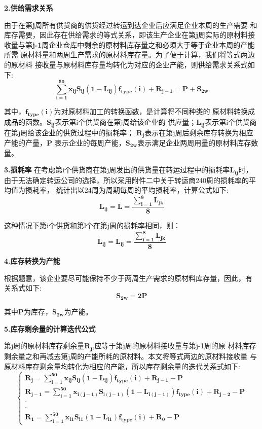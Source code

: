 \documentclass[UTF8]{ctexart}
\begin{document}
\textbf{2.供给需求关系}

由于在第\textbf{j}周所有供货商的供货经过转运到达企业后应满足企业本周的生产需要
和库存需要，因此存在供给需求的等式关系，即该生产企业在第\textbf{j}周实际的原材料接
收量与第\textbf{j-1}周企业仓库中剩余的原材料库存量之和必须大于等于企业本周的产能所需
原材料量和两周生产需求的原材料库存量。为了便于计算，我们将等式两边的原材料
接收量与原材料库存量均转化为对应的企业产能，则供给需求关系式如下:
\begin{equation}
	\mathbf{\sum_{i=1}^{50} x_{ij}S_{ij}(1-L_{ij})f_{type}(i)+R_{j-1}=P+S_{2w}}
\end{equation}

其中，$\mathbf{f_{type}(i)}$为对原材料加工的转换函数，是计算将不同种类的
原材料转换成成品的函数。$\mathbf{S_{ij}}$表示第i个供货商在第j周给该企业的
供应量；$\mathbf{L_{ij}}$表示第i个供货商在第j周给该企业的供货过程中的损耗率；
$\mathbf{R_{j}}$表示在第j周后剩余库存转换为相应产能的产量，$\mathbf{P}$
表示企业的每周产能，$\mathbf{S_{2w}}$表示满足企业两周用量的原材料库存数量。

\textbf{3.损耗率}
在考虑第i个供货商在第j周发出的供货量在转运过程中的损耗率$\mathbf{L_{ij}}$时，
由于无法确定转运公司的选择，所以采用附件二中关于转运商240周的损耗率的平均值为损耗率，
统计出以24周为周期每周的平均损耗率，计算公式如下:
\begin{equation}
	\mathbf{L_{ij} =\bar{L} =\frac{\sum_{i=1}^{8}L_{jk} }{8}}
\end{equation}


这种情况下第i个供货和第l个在第j周的损耗率相同，则：
\begin{equation}
	\mathbf{L_{ij} =L_{lj} =\frac{\sum_{i=1}^{8}L_{jk} }{8}}
\end{equation}

\textbf{4.库存转换为产能}

根据题意，该企业要尽可能保持不少于两周生产需求的原材料库存量，因此，有
关系式如下:
\begin{equation}
	\mathbf{S_{2w}=2P}
\end{equation}

其中\textbf{P}为库存，$\mathbf{S_{2w}}$为产能。

\textbf{5.库存剩余量的计算迭代公式}

第j周的原材料库存剩余量$\mathbf{R_{j}}$,应等于第j周的原材料接收量与第j-1周的原
材料库存剩余量之和再减去第j周的产能所耗的原材料。本文将等式两边的原材料接收量
与原材料库存剩余量均转化为相应的产能，所以库存剩余量的迭代关系式如下:
\begin{equation}
	\mathbf{\begin{cases}
		R_{j}=\sum_{i=1}^{50}x_{ij}S_{ij}(1-L_{ij})f_{type}(i)+R_{j-1}-P  \\
		R_{j-1}=\sum_{i=1}^{50}x_{i(j-1)}S_{i(j-1)}(1-L_{i(j-1)})f_{type}(i)+R_{j-2}-P\\
		\cdot  \\
		\cdot  \\
		R_{1}=\sum_{i=1}^{50}x_{i1}S_{i1}(1-L_{i1})f_{type}(i)+R_{0}-P
		\end{cases}}
\end{equation}
\end{document}
